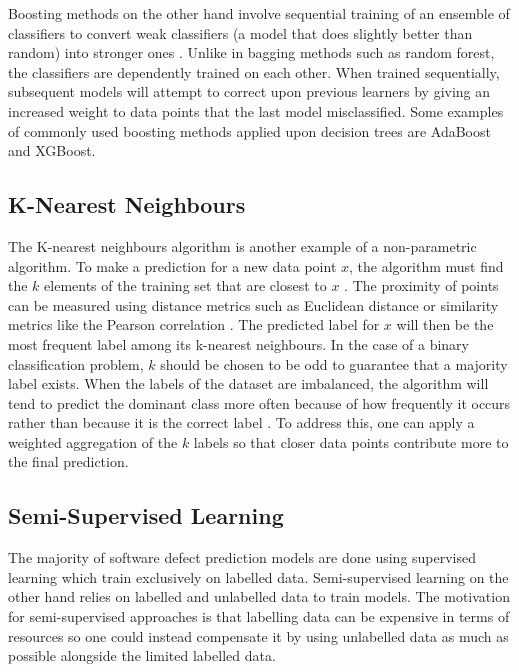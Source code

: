 \documentclass[../main.tex]{subfiles}
\begin{document}
Boosting methods on the other hand involve sequential training of an ensemble of classifiers to convert weak classifiers (a model that does slightly better than random) into stronger ones \cite{sewell2008ensemble}. Unlike in bagging methods such as random forest, the classifiers are dependently trained on each other. When trained sequentially, subsequent models will attempt to correct upon previous learners by giving an increased weight to data points that the last model misclassified. Some examples of commonly used boosting methods applied upon decision trees are AdaBoost and XGBoost. 

\subsection{K-Nearest Neighbours}

The K-nearest neighbours algorithm is another example of a non-parametric algorithm. To make a prediction for a new data point $x$, the algorithm must find the $k$ elements of the training set that are closest to $x$ \cite{cunningham2007k}. The proximity of points can be measured using distance metrics such as Euclidean distance or similarity metrics like the Pearson correlation \cite{jaskowiak2011comparing}. The predicted label for $x$ will then be the most frequent label among its k-nearest neighbours. In the case of a binary classification problem, $k$ should be chosen to be odd to guarantee that a majority label exists. When the labels of the dataset are imbalanced, the algorithm will tend to predict the dominant class more often because of how frequently it occurs rather than because it is the correct label \cite{coomans1982alternative}. To address this, one can apply a weighted aggregation of the $k$ labels so that closer data points contribute more to the final prediction.  

\subsection{Semi-Supervised Learning}

The majority of software defect prediction models are done using supervised learning which train exclusively on labelled data. Semi-supervised learning on the other hand relies on labelled and unlabelled data to train models. The motivation for semi-supervised approaches is that labelling data can be expensive in terms of resources so one could instead compensate it by using unlabelled data as much as possible alongside the limited labelled data. 
\end{document}
